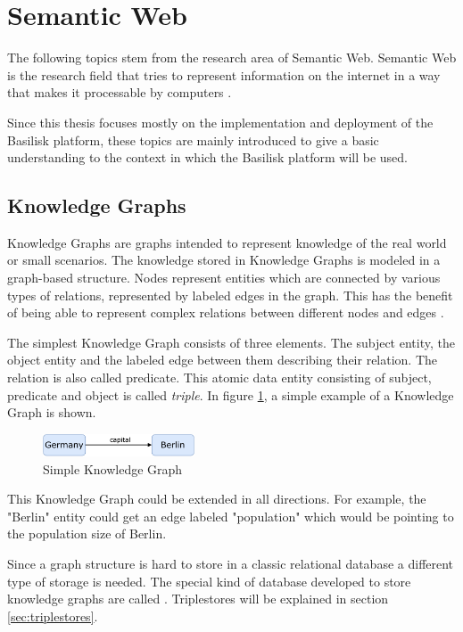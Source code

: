 \section{Semantic Web}
\label{sec:sw_topics}
The following topics stem from the research area of Semantic Web.
Semantic Web is the research field that tries to represent information on the internet in a way that makes it processable by computers \cite{hitzlerSemanticWebGrundlagen2008}.

Since this thesis focuses mostly on the implementation and deployment of the Basilisk platform, these topics are mainly introduced to give a basic understanding to the context in which the Basilisk platform will be used.

\subsection{Knowledge Graphs} 
\label{sec:knowledge_graphs}
Knowledge Graphs are graphs intended to represent knowledge of the real world or small scenarios.
The knowledge stored in Knowledge Graphs is modeled in a graph-based structure. 
Nodes represent entities which are connected by various types of relations, represented by labeled edges in the graph.
This has the benefit of being able to represent complex relations between different nodes and edges \cite{hoganKnowledgeGraphs2021}.

The simplest Knowledge Graph consists of three elements.
The subject entity, the object entity and the labeled edge between them describing their relation.
The relation is also called predicate.
This atomic data entity consisting of subject, predicate and object is called \emph{triple}.
In figure \ref{fig:example-knowledge-graph}, a simple example of a Knowledge Graph is shown.

\begin{figure}[tbph]
	\centering
	\includegraphics[width=0.4\textwidth]{figures/knowledge-graph-diagram}
	\caption{Simple Knowledge Graph}
	\label{fig:example-knowledge-graph}
\end{figure}

This Knowledge Graph could be extended in all directions.
For example, the "Berlin" entity could get an edge labeled "population" which would be pointing to the population size of Berlin.

Since a graph structure is hard to store in a classic relational database a different type of storage is needed.
The special kind of database developed to store knowledge graphs are called \tsp{}.
Triplestores will be explained in section \ref{sec:triplestores}.


